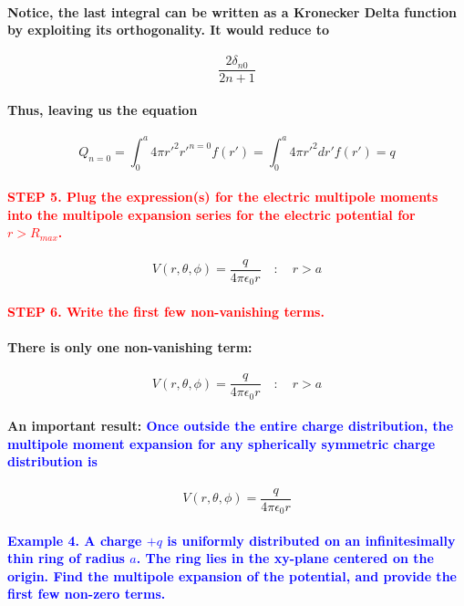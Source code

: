 \documentclass{article}
\begin{document}
\paragraph{\indent Notice, the last integral can be written as a Kronecker Delta function by exploiting its orthogonality. It would reduce to}
\begin{equation*}
    \frac{2\delta_{n0}}{2n+1}
\end{equation*}
\paragraph{\indent Thus, leaving us the equation}
\begin{equation*}
    Q_{n=0}=\int_0^a 4\pi r'^2 r'^{n=0}f(r')=\int_0^a 4\pi r'^2dr'f(r')=q
\end{equation*}
\paragraph{\textcolor{red}{STEP 5. Plug the expression(s) for the electric multipole moments into the multipole expansion series for the electric potential for $r>R_{max}$.}}
\begin{equation*}
    V(r,\theta,\phi)=\frac{q}{4\pi\epsilon_0r} \quad:\quad r>a
\end{equation*}
\paragraph{\textcolor{red}{STEP 6. Write the first few non-vanishing terms.}}
\paragraph{\indent There is only one non-vanishing term:}
\begin{equation*}
    V(r,\theta,\phi)=\frac{q}{4\pi\epsilon_0r} \quad:\quad r>a
\end{equation*}
\paragraph{\indent An important result: \textcolor{blue}{Once outside the entire charge distribution, the multipole moment expansion for any spherically symmetric charge distribution is}}
\begin{equation*}
    V(r,\theta,\phi)=\frac{q}{4\pi\epsilon_0r}
\end{equation*}
\paragraph{\textcolor{blue}{Example 4. A charge $+q$ is uniformly distributed on an infinitesimally thin ring of radius $a$. The ring lies in the xy-plane centered on the origin. Find the multipole expansion of the potential, and provide the first few non-zero terms.}}
\end{document}
